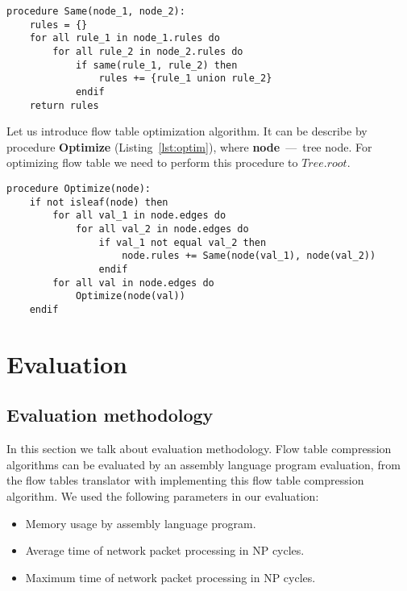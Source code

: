 \documentclass[conference]{IEEEtran}
\begin{document}
\begin{lstlisting}[float=htb,caption=Procedure for obtaining a set of rules derivedfrom the same rules,label=lst:same]
procedure Same(node_1, node_2):
    rules = {}
    for all rule_1 in node_1.rules do
        for all rule_2 in node_2.rules do
            if same(rule_1, rule_2) then
                rules += {rule_1 union rule_2}
            endif
    return rules
\end{lstlisting}

            Let us introduce flow table optimization algorithm. It can be describe by procedure \textbf{Optimize} (Listing~\ref{lst:optim}), 
            where \textbf{node}~---~tree node. For optimizing flow table we need to perform this procedure to \(Tree.root\).

\begin{lstlisting}[float=htb,caption=Procedure for optimizing the tree,label=lst:optim]
procedure Optimize(node):
    if not isleaf(node) then
        for all val_1 in node.edges do
            for all val_2 in node.edges do
                if val_1 not equal val_2 then
                    node.rules += Same(node(val_1), node(val_2))
                endif
        for all val in node.edges do
            Optimize(node(val))
    endif
\end{lstlisting}

    \section{Evaluation}
        \subsection{Evaluation methodology}
        In this section we talk about evaluation methodology. Flow table compression algorithms can be evaluated by an 
        assembly language program evaluation, from the flow tables translator with implementing
        this flow table compression algorithm.
        We used the following parameters in our evaluation:
        \begin{itemize}
            \item Memory usage by assembly language program.
            \item Average time of network packet processing in NP cycles.
            \item Maximum time of network packet processing in NP cycles.
        \end{itemize}
        
\end{document}
